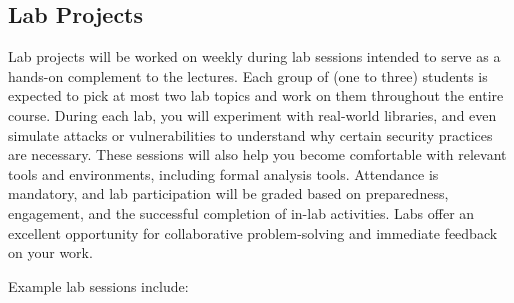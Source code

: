\documentclass[10pt,a4paper,american]{article}
\begin{document}
\subsection{Lab Projects}
Lab projects will be worked on weekly during lab sessions intended to serve as a hands-on complement to the lectures. Each group of (one to three) students is expected to pick at most two lab topics and work on them throughout the entire course. During each lab, you will experiment with real-world libraries, and even simulate attacks or vulnerabilities to understand why certain security practices are necessary. These sessions will also help you become comfortable with relevant tools and environments, including formal analysis tools. Attendance is mandatory, and lab participation will be graded based on preparedness, engagement, and the successful completion of in-lab activities. Labs offer an excellent opportunity for collaborative problem-solving and immediate feedback on your work.

Example lab sessions include:
\end{document}
